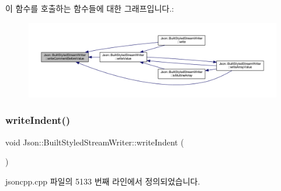 이 함수를 호출하는 함수들에 대한 그래프입니다.\+:\nopagebreak
\begin{figure}[H]
\begin{center}
\leavevmode
\includegraphics[width=350pt]{struct_json_1_1_built_styled_stream_writer_a32c4afca4e08fba79bb0a80a8010283a_icgraph}
\end{center}
\end{figure}
\mbox{\label{struct_json_1_1_built_styled_stream_writer_a2b38a3714d415c4bd3b4812897130f3d}} 
\subsubsection{\texorpdfstring{write\+Indent()}{writeIndent()}}
{\footnotesize\ttfamily void Json\+::\+Built\+Styled\+Stream\+Writer\+::write\+Indent (\begin{DoxyParamCaption}{ }\end{DoxyParamCaption})\hspace{0.3cm}{\ttfamily [private]}}



jsoncpp.\+cpp 파일의 5133 번째 라인에서 정의되었습니다.


